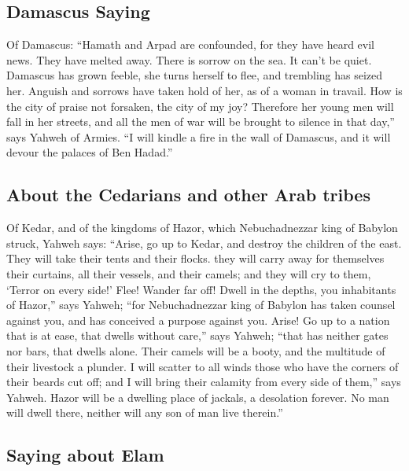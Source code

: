 \hypertarget{damascus-saying}{%
\subsection{Damascus Saying}\label{damascus-saying}}

 Of Damascus: ``Hamath and Arpad are confounded, for they
have heard evil news. They have melted away. There is sorrow on the sea.
It can't be quiet.  Damascus has grown feeble, she turns
herself to flee, and trembling has seized her. Anguish and sorrows have
taken hold of her, as of a woman in travail.  How is the
city of praise not forsaken, the city of my joy? 
Therefore her young men will fall in her streets, and all the men of war
will be brought to silence in that day,'' says Yahweh of Armies.
 ``I will kindle a fire in the wall of Damascus, and it
will devour the palaces of Ben Hadad.''

\hypertarget{about-the-cedarians-and-other-arab-tribes}{%
\subsection{About the Cedarians and other Arab
tribes}\label{about-the-cedarians-and-other-arab-tribes}}

 Of Kedar, and of the kingdoms of Hazor, which
Nebuchadnezzar king of Babylon struck, Yahweh says: ``Arise, go up to
Kedar, and destroy the children of the east.  They will
take their tents and their flocks. they will carry away for themselves
their curtains, all their vessels, and their camels; and they will cry
to them, `Terror on every side!'  Flee! Wander far off!
Dwell in the depths, you inhabitants of Hazor,'' says Yahweh; ``for
Nebuchadnezzar king of Babylon has taken counsel against you, and has
conceived a purpose against you.  Arise! Go up to a
nation that is at ease, that dwells without care,'' says Yahweh; ``that
has neither gates nor bars, that dwells alone.  Their
camels will be a booty, and the multitude of their livestock a plunder.
I will scatter to all winds those who have the corners of their beards
cut off; and I will bring their calamity from every side of them,'' says
Yahweh.  Hazor will be a dwelling place of jackals, a
desolation forever. No man will dwell there, neither will any son of man
live therein.''

\hypertarget{saying-about-elam}{%
\subsection{Saying about Elam}\label{saying-about-elam}}

